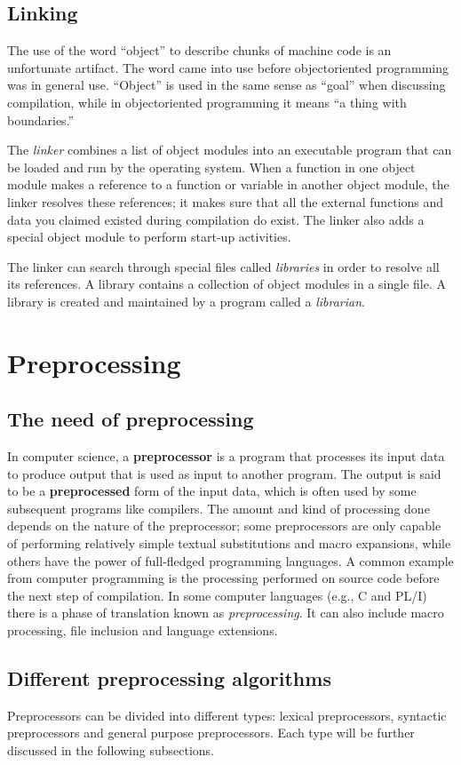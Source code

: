 \documentclass[a4paper]{report}
\begin{document}
\subsection{Linking}
The use of the word “object” to describe chunks of machine code is an unfortunate artifact. The word came into use before objectoriented programming was in general use. “Object” is used in the same sense as “goal” when discussing compilation, while in objectoriented programming it means “a thing with boundaries.” 
\par
The \emph{linker} combines a list of object modules into an executable program that can be loaded and run by the operating system. When a function in one object module makes a reference to a function or variable in another object module, the linker resolves these references; it makes sure that all the external functions and data you claimed existed during compilation do exist. The linker also adds a special object module to perform start-up activities. 
\par
The linker can search through special files called \emph{libraries} in order to resolve all its references. A library contains a collection of object modules in a single file. A library is created and maintained by a program called a \emph{librarian}. 
\section{Preprocessing}
\subsection{The need of preprocessing}
In computer science, a \textbf{preprocessor} is a program that processes its input data to produce output that is used as input to another program. The output is said to be a \textbf{preprocessed} form of the input data, which is often used by some subsequent programs like compilers. The amount and kind of processing done depends on the nature of the preprocessor; some preprocessors are only capable of performing relatively simple textual substitutions and macro expansions, while others have the power of full-fledged programming languages. 
A common example from computer programming is the processing performed on source code before the next step of compilation. In some computer languages (e.g., C and PL/I) there is a phase of translation known as \emph{preprocessing}. It can also include macro processing, file inclusion and language extensions. 

\subsection{Different preprocessing algorithms}
Preprocessors can be divided into different types: lexical preprocessors, syntactic preprocessors and general purpose preprocessors. Each type will be further discussed in the following subsections.
\end{document}
